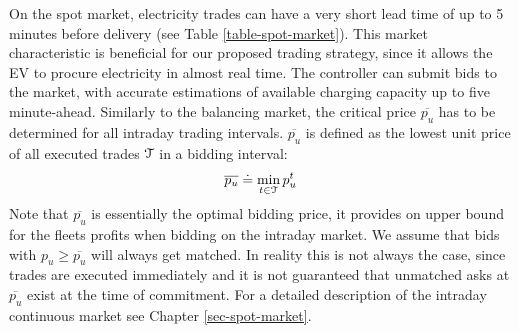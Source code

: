 \documentclass[a4paper, 12pt]{article}
\begin{document}
On the spot market, electricity trades can have a very short lead time of up to
5 minutes before delivery (see Table \ref{table-spot-market}). This market
characteristic is beneficial for our proposed trading strategy, since it allows
the EV to procure electricity in almost real time. The controller can submit
bids to the market, with accurate estimations of available charging capacity up
to five minute-ahead. Similarly to the balancing market, the critical price
\(\overline{p_u}\) has to be determined for all intraday trading intervals.
\(\overline{p_u}\) is defined as the lowest unit price of all executed trades
\(\cal{T}\) in a bidding interval:
\begin{equation*}
    \overline{p_u} \doteq \min_{t \in \cal{T}} p_u^t
\end{equation*}
Note that \(\overline{p_u}\) is essentially the optimal bidding price, it provides
on upper bound for the fleets profits when bidding on the intraday market. We
assume that bids with  \(p_u \geq \overline{p_u}\) will always get matched. In
reality this is not always the case, since trades are executed immediately and
it is not guaranteed that unmatched asks at \(\overline{p_u}\) exist at the time
of commitment. For a detailed description of the intraday continuous market see
Chapter \ref{sec-spot-market}.
\end{document}
